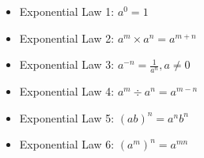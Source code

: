 \begin{itemize}[noitemsep, label=\textbullet{}]
\begin{itemize}[noitemsep]
            \item Exponential Law 1: \begin{math}{a}^{0}=1\end{math}\item Exponential Law 2: \begin{math}{a}^{m}\ensuremath{\times}{a}^{n}={a}^{m+n}\end{math}\item Exponential Law 3: \begin{math}{a}^{-n}=\frac{1}{{a}^{n}},a\ne 0\end{math}\item Exponential Law 4: \begin{math}{a}^{m}÷{a}^{n}={a}^{m-n}\end{math}\item Exponential Law 5: \begin{math}{\left(ab\right)}^{n}={a}^{n}{b}^{n}\end{math}\item Exponential Law 6: \begin{math}{\left({a}^{m}\right)}^{n}={a}^{mn}\end{math}\end{itemize}
        \end{itemize}

